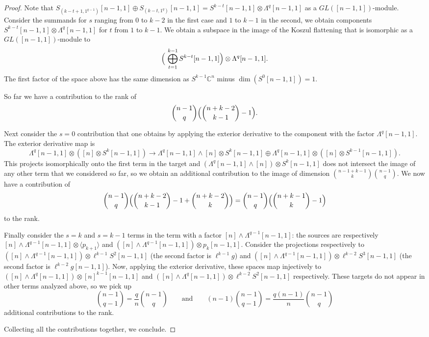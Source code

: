 \documentclass{toc}
\def\BC{\mathbb C}
\def\ww{\wedge}
\def\La#1{\Lambda^{#1}}
\def\tdim{\operatorname{dim}}
\begin{document}
\begin{proof}
Note that $S_{(k-t+1,1^{q-1})}[n-1,1]\oplus S_{(k-t,1^q)}[n-1,1]=S^{k-t}[n-1,1]\otimes \La{q}[n-1,1]$ as a $GL([n-1,1])$-module. Consider the summands for $s$ ranging from $0$ to $k-2 $ in the first case and $1$ to $k -1$ in the second, we obtain components $S^{k-t}[n-1,1]\otimes \La{q}[n-1,1]$ for $t$ from $1$ to $k-1$. We obtain a subspace in the image of the Koszul flattening that is isomorphic as a $GL([n-1,1])$-module to 
$$
\Bigl( \ \bigoplus_{t=1}^{k-1}S^{k-t}[n-1,1] \Bigr)\otimes \La{q}[n-1,1].
$$
The first factor of the space above has the same dimension as $S^{k-1}\BC^n$ minus $\tdim (S^0[n-1,1])=1$.

So far we have a contribution to the rank of
$$
\binom{n-1}{q} \Bigl( \binom{n+k-2}{k-1} - 1 \Bigr).
$$

Next consider the $s=0$ contribution that one obtains by applying the exterior derivative to the component with the factor $\Lambda^q [n-1,1]$. The exterior derivative map is
\[
  \La q [n-1,1]  \otimes ([n] \otimes S^k[n-1,1]) \to \La q [n-1,1]\ww [n]  \otimes S^k[n-1,1] \oplus  \Lambda^q [n-1,1] \otimes ([n]\otimes  S^{k-1}[n-1,1]).
\]
This projects isomorphically onto the first term in the target and
$(\La q [n-1,1]\ww [n]) \otimes S^k[n-1,1]$ does not intersect the
image of any other term that we considered so far, so we obtain an
additional contribution to the image of dimension
$\binom{n-1+k-1}{k}\binom{n-1}q$. We now have a contribution of
$$
\binom{n-1}q \Bigl(\binom{n+k-2}{k-1} - 1+ \binom{n+k-2}{k} \Bigr)=\binom{n-1}q \Bigl(\binom{n+k-1}{k } - 1\Bigr)  
$$
to the rank. 

Finally consider  the $s=k$ and $s=k-1$ terms in the term with a factor $[n] \wedge \Lambda^{q-1}[n-1,1]$: the sources are respectively $[n]\ww \La {q-1} [n-1,1] \otimes \langle p_{k+1} \rangle$ and $([n] \wedge \Lambda^{q-1} [n-1,1]) \otimes p_{k }[n-1,1]$. Consider the projections respectively to $([n]\ww \La {q-1} [n-1,1] )\otimes \ell^{k-1}S^2[n-1,1]$ (the second factor is $\ell^{k-1}g$) and $( [n]\ww \La {q-1} [n-1,1]) \otimes \ell^{k-2}S^3[n-1,1]$ (the second factor is $\ell^{k-2}g[n-1,1]$). Now, applying the exterior derivative, these spaces map injectively to $([n] \wedge \Lambda^{q}[n-1,1]) \otimes [n]^{k-1} [n-1,1]$ and $([n] \wedge \Lambda^{q}[n-1,1]) \otimes \ell^{k-2}S^2 [n-1,1]$ respectively. These targets do not appear in other terms analyzed above, so we pick up
\[
  \binom{n-1}{q-1}=\frac qn \binom{n-1}{q}\qquad\text{and}\qquad (n-1)\binom{n-1}{q-1}=\frac{q(n-1)}n\binom{n-1}q
\]
additional contributions to the rank.

Collecting all the contributions together, we conclude.
\end{proof}
\end{document}
